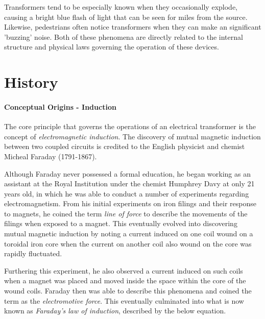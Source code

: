 \documentclass[12pt]{article}
\begin{document}
Transformers tend to be especially known when they occasionally explode, causing a bright blue flash of light that can be seen for miles from the source. Likewise, pedestrians often notice transformers when they can make an significant 'buzzing' noise. Both of these phenomena are directly related to the internal structure and physical laws governing the operation of these devices.

\section{History}

\paragraph{Conceptual Origins - Induction} 
The core principle that governs the operations of an electrical transformer is the concept of \textit{electromagnetic induction}. The discovery of mutual magnetic induction between two coupled circuits is credited to the English physicist and chemist Micheal Faraday (1791-1867).

Although Faraday never possessed a formal education, he began working as an assistant at the Royal Institution under the chemist Humphrey Davy at only 21 years old, in which he was able to conduct a number of experiments regarding electromagnetism. From his initial experiments on iron filings and their response to magnets, he coined the term \textit{line of force} to describe the movements of the filings when exposed to a magnet. This eventually evolved into discovering mutual magnetic induction by noting a current induced on one coil wound on a toroidal iron core when the current on another coil also wound on the core was rapidly fluctuated. 

Furthering this experiment, he also observed a current induced on such coils when a magnet was placed and moved inside the space within the core of the wound coils. Faraday then was able to describe this phenomena and coined the term as the \textit{electromotive force}. This eventually culminated into what is now known as \textit{Faraday's law of induction}, described by the below equation. 

\begin{center}
\begin{huge}
\end{huge}
\end{center}
\end{document}
